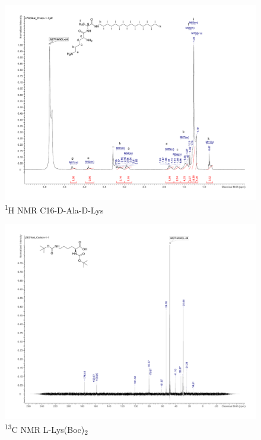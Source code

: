 \begin{figure}[ht!]
\centering
\includegraphics[scale=0.47]{NMR/KAT1_35.pdf}
\caption{\textsuperscript{1}H NMR C16-D-Ala-D-Lys}
\label{KAT1.35_NMR2}
\end{figure}

\begin{figure}[ht!]
\centering
\includegraphics[scale=0.47]{13CNMR/KAT1_1_13C.pdf}
\caption{\textsuperscript{13}C NMR L-Lys(Boc)\textsubscript{2}}
\label{KAT1.1_13C}
\end{figure}

